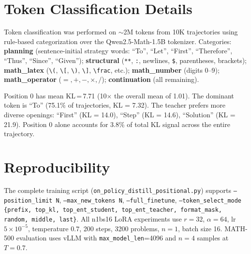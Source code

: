 \documentclass[10pt]{article}
\begin{document}
\section{Token Classification Details}
\label{app:token_class}

Token classification was performed on $\sim$2M tokens from 10K trajectories using rule-based categorization over the Qwen2.5-Math-1.5B tokenizer. Categories: \textbf{planning} (sentence-initial strategy words: ``To'', ``Let'', ``First'', ``Therefore'', ``Thus'', ``Since'', ``Given''); \textbf{structural} (\texttt{**}, \texttt{:}, newlines, \texttt{\$}, parentheses, brackets); \textbf{math\_latex} (\texttt{\textbackslash(}, \texttt{\textbackslash[}, \texttt{\textbackslash)}, \texttt{\textbackslash]}, \texttt{\textbackslash frac}, etc.); \textbf{math\_number} (digits 0--9); \textbf{math\_operator} ($=,+,-,\times,/$); \textbf{continuation} (all remaining).

Position 0 has mean KL\,=\,7.71 (10$\times$ the overall mean of 1.01). The dominant token is ``To'' (75.1\% of trajectories, KL = 7.32). The teacher prefers more diverse openings: ``First'' (KL = 14.0), ``Step'' (KL = 14.6), ``Solution'' (KL = 21.9). Position 0 alone accounts for 3.8\% of total KL signal across the entire trajectory.

\section{Reproducibility}
\label{app:repro}

The complete training script (\texttt{on\_policy\_distill\_positional.py}) supports \texttt{--position\_limit N}, \texttt{--max\_new\_tokens N}, \texttt{--full\_finetune}, \texttt{--token\_select\_mode \{prefix, top\_kl, top\_ent\_student, top\_ent\_teacher, format\_mask, random, middle, last\}}. All n1bs16 LoRA experiments use $r=32$, $\alpha=64$, lr $5\times 10^{-5}$, temperature $0.7$, 200 steps, 3200 problems, $n=1$, batch size 16. MATH-500 evaluation uses vLLM \citep{kwon2023vllm} with \texttt{max\_model\_len}=4096 and $n=4$ samples at $T=0.7$.
\end{document}
